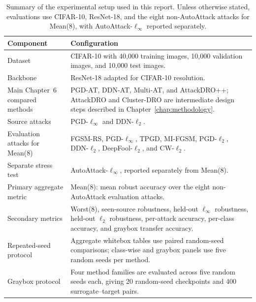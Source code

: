 \begin{table}[H]
\centering
\caption[Experimental setup summary]{Summary of the experimental setup used in this report. Unless otherwise stated, evaluations use CIFAR-10, ResNet-18, and the eight non-AutoAttack attacks for Mean(8), with AutoAttack-$\ell_\infty$ reported separately.}
\label{tab:ch5_setup_summary}
\footnotesize
\setlength{\tabcolsep}{4pt}
\renewcommand{\arraystretch}{1.08}
\begin{tabularx}{\textwidth}{@{}
>{\raggedright\arraybackslash}p{}
>{\raggedright\arraybackslash}X
@{}}
\toprule
Component & Configuration \\
\midrule

Dataset
& CIFAR-10 with 40{,}000 training images, 10{,}000 validation images, and 10{,}000 test images. \\

Backbone
& ResNet-18 adapted for CIFAR-10 resolution. \\

Main Chapter~6 compared methods
& PGD-AT, DDN-AT, Multi-AT, and AttackDRO++; AttackDRO and Cluster-DRO are intermediate design steps described in Chapter~\ref{chap:methodology}. \\

Source attacks
& PGD-$\ell_\infty$ and DDN-$\ell_2$. \\

Evaluation attacks for Mean(8)
& FGSM-RS, PGD-$\ell_\infty$, TPGD, MI-FGSM, PGD-$\ell_2$, DDN-$\ell_2$, DeepFool-$\ell_2$, and CW-$\ell_2$. \\

Separate stress test
& AutoAttack-$\ell_\infty$, reported separately from Mean(8). \\

Primary aggregate metric
& Mean(8): mean robust accuracy over the eight non-AutoAttack evaluation attacks. \\

Secondary metrics
& Worst(8), seen-source robustness, held-out $\ell_\infty$ robustness, held-out $\ell_2$ robustness, per-attack accuracy, per-class accuracy, and graybox transfer accuracy. \\

Repeated-seed protocol
& Aggregate whitebox tables use paired random-seed comparisons; class-wise and graybox panels use five random seeds per method. \\

Graybox protocol
& Four method families are evaluated across five random seeds each, giving 20 random-seed checkpoints and 400 surrogate--target pairs. \\


\end{tabularx}
\end{table}
